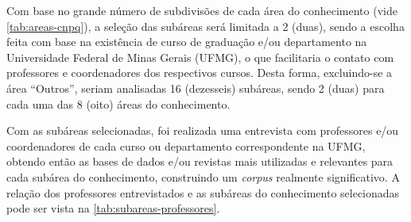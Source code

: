 Com base no grande número de subdivisões de cada área do conhecimento (vide \autoref{tab:areas-cnpq}), a seleção das subáreas será limitada a 2 (duas), sendo a escolha feita com base na existência de curso de graduação e/ou departamento na Universidade Federal de Minas Gerais (UFMG), o que facilitaria o contato com professores e coordenadores dos respectivos cursos. Desta forma, excluindo-se a área ``Outros'', seriam analisadas 16 (dezesseis) subáreas, sendo 2 (duas) para cada uma das 8 (oito) áreas do conhecimento.

Com as subáreas selecionadas, foi realizada uma entrevista com professores e/ou coordenadores de cada curso ou departamento correspondente na UFMG, obtendo então as bases de dados e/ou revistas mais utilizadas e relevantes para cada subárea do conhecimento, construindo um \emph{corpus} realmente significativo. A relação dos professores entrevistados e as subáreas do conhecimento selecionadas pode ser vista na \autoref{tab:subareas-professores}.

